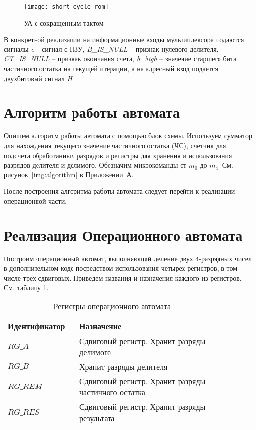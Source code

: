 \documentclass[a4paper,14pt]{extarticle}
\begin{document}
\begin{figure}[h!]
	\begin{center}
		\texttt{[image: short\_cycle\_rom]}
		\caption{УА с сокращенным тактом}
		\label{img:scheme}
	\end{center}	
\end{figure}

В конкретной реализации на информационные входы мультиплексора подаются сигналы \textit{e} -- сигнал с ПЗУ, \textit{B\_IS\_NULL} -- признак нулевого делителя, \textit{CT\_IS\_NULL} -- признак окончания счета, \textit{b\_high} -- значение старшего бита частичного остатка на текущей итерации, а на адресный вход подается двухбитовый сигнал \textit{H}.
\section{Алгоритм работы автомата}
Опишем алгоритм работы автомата с помощью блок схемы. Используем сумматор для нахождения текущего значение частичного остатка (ЧО), счетчик для подсчета обработанных разрядов и регистры для хранения и использования разрядов делителя и делимого. Обозначим микрокоманды от $m_0$ до $m_4$. См. рисунок~\ref{img:algorithm} в \hyperref[tam]{Приложении~А}.

После построения алгоритма работы автомата следует перейти к реализации операционной части.

\section {Реализация Операционного автомата}
Построим операционный автомат, выполняющий деление двух 4-разрядных чисел в дополнительном коде посредством использования четырех регистров, в том числе трех сдвиговых. Приведем названия и назначения каждого из регистров. См. таблицу \ref{tab:regs}.
\begin{table}[h!]
	\centering
		\begin{tabular}{|m{0.27\linewidth}|m{0.6\linewidth}|}
			\hline
			\textbf{Идентификатор} & \textbf{Назначение} \\ \hline
			$RG\_A$ & Сдвиговый регистр. Хранит разряды делимого \\ \hline
			$RG\_B$ & Хранит разряды делителя \\ \hline
			$RG\_REM$ & Сдвиговый регистр. Хранит разряды частичного остатка \\ \hline
			$RG\_RES$ & Сдвиговый регистр. Хранит разряды результата \\ \hline
		\end{tabular}
		\caption{Регистры операционного автомата}
		\label{tab:regs}
\end{table}
\end{document}
